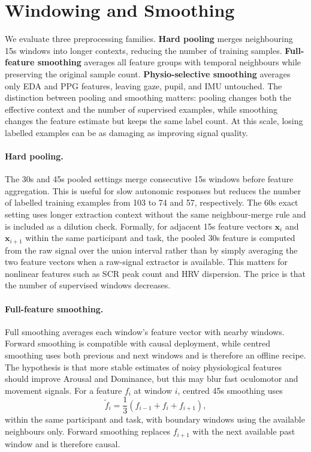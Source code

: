 \documentclass[sigconf,review,anonymous]{acmart}
\begin{document}
\section{Windowing and Smoothing}
\label{sec:windowing}

We evaluate three preprocessing families.
\textbf{Hard pooling} merges neighbouring 15s windows into longer contexts,
reducing the number of training samples.
\textbf{Full-feature smoothing} averages all feature groups with temporal
neighbours while preserving the original sample count.
\textbf{Physio-selective smoothing} averages only EDA and PPG features, leaving
gaze, pupil, and IMU untouched.
The distinction between pooling and smoothing matters: pooling changes both the
effective context and the number of supervised examples, while smoothing changes
the feature estimate but keeps the same label count.
At this scale, losing labelled examples can be as damaging as improving signal
quality.

\paragraph{Hard pooling.}
The 30s and 45s pooled settings merge consecutive 15s windows before feature
aggregation.
This is useful for slow autonomic responses but reduces the number of labelled
training examples from 103 to 74 and 57, respectively.
The 60s exact setting uses longer extraction context without the same
neighbour-merge rule and is included as a dilution check.
Formally, for adjacent 15s feature vectors $\mathbf{x}_{i}$ and
$\mathbf{x}_{i+1}$ within the same participant and task, the pooled 30s feature
is computed from the raw signal over the union interval rather than by simply
averaging the two feature vectors when a raw-signal extractor is available.
This matters for nonlinear features such as SCR peak count and HRV dispersion.
The price is that the number of supervised windows decreases.

\paragraph{Full-feature smoothing.}
Full smoothing averages each window's feature vector with nearby windows.
Forward smoothing is compatible with causal deployment, while centred smoothing
uses both previous and next windows and is therefore an offline recipe.
The hypothesis is that more stable estimates of noisy physiological features
should improve Arousal and Dominance, but this may blur fast oculomotor and
movement signals.
For a feature $f_{i}$ at window $i$, centred 45s smoothing uses
\begin{equation}
  \tilde{f}_{i} = \frac{1}{3}\left(f_{i-1}+f_i+f_{i+1}\right),
\end{equation}
within the same participant and task, with boundary windows using the available
neighbours only.
Forward smoothing replaces $f_{i+1}$ with the next available past window and is
therefore causal.
\end{document}
